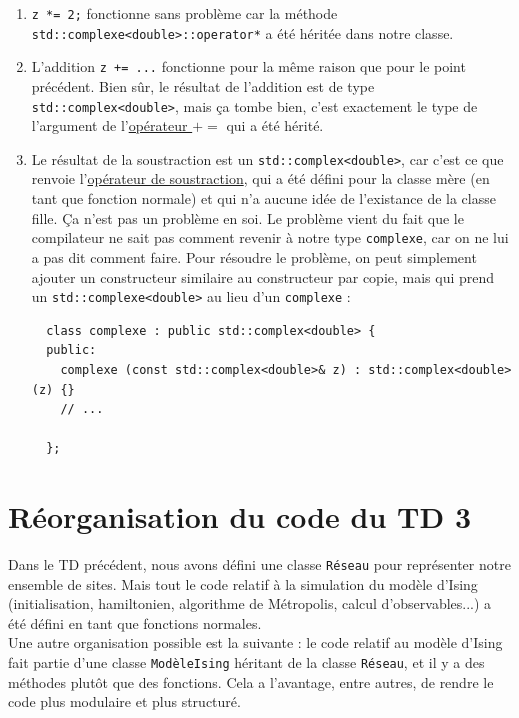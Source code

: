 \documentclass{book}
\newcommand{\inline}[1]{\texttt{#1}}
\renewenvironment{correction}{}{}
\begin{document}
\begin{correction}
\begin{enumerate}
  \item \inline{z *= 2;} fonctionne sans problème car la méthode \inline{std::complexe<double>::operator*} a été héritée dans notre classe.

  \item L'addition \inline{z += ...} fonctionne pour la même raison que pour le point précédent. Bien sûr, le résultat de l'addition est de type \inline{std::complex<double>}, mais ça tombe bien, c'est exactement le type de l'argument de l'\href{https://en.cppreference.com/w/cpp/numeric/complex/operator_arith}{opérateur $+=$} qui a été hérité.

  \item Le résultat de la soustraction est un \inline{std::complex<double>}, car c'est ce que renvoie l'\href{https://en.cppreference.com/w/cpp/numeric/complex/operator_arith2}{opérateur de soustraction}, qui a été défini pour la classe mère (en tant que fonction normale) et qui n'a aucune idée de l'existance de la classe fille. Ça n'est pas un problème en soi. Le problème vient du fait que le compilateur ne sait pas comment revenir à notre type \inline{complexe}, car on ne lui a pas dit comment faire. Pour résoudre le problème, on peut simplement ajouter un constructeur similaire au constructeur par copie, mais qui prend un \inline{std::complexe<double>} au lieu d'un \inline{complexe} :
  \begin{verbatim}
  class complexe : public std::complex<double> {
  public:
    complexe (const std::complex<double>& z) : std::complex<double>(z) {}
    // ...

  };
  \end{verbatim}

\end{enumerate}

\end{correction}

\section{Réorganisation du code du TD 3}

Dans le TD précédent, nous avons défini une classe \inline{Réseau} pour représenter notre ensemble de sites. Mais tout le code relatif à la simulation du modèle d'Ising (initialisation, hamiltonien, algorithme de Métropolis, calcul d'observables...) a été défini en tant que fonctions normales.\\

Une autre organisation possible est la suivante : le code relatif au modèle d'Ising fait partie d'une classe \inline{ModèleIsing} héritant de la classe \inline{Réseau}, et il y a des méthodes plutôt que des fonctions. Cela a l'avantage, entre autres, de rendre le code plus modulaire et plus structuré.\\
\end{document}
